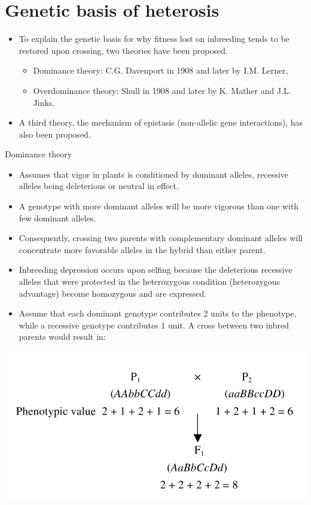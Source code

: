 \documentclass[11pt,ignorenonframetext,aspectratio=169]{beamer}
\providecommand{\tightlist}{%
  \setlength{\itemsep}{0pt}\setlength{\parskip}{0pt}}
\begin{document}
\hypertarget{genetic-basis-of-heterosis}{%
\section{Genetic basis of heterosis}\label{genetic-basis-of-heterosis}}

\begin{frame}{}
\protect\hypertarget{section-5}{}
\begin{itemize}
\tightlist
\item
  To explain the genetic basis for why fitness lost on inbreeding tends
  to be restored upon crossing, two theories have been proposed.

  \begin{itemize}
  \tightlist
  \item
    Dominance theory: C.G. Davenport in 1908 and later by I.M. Lerner,
  \item
    Overdominance theory: Shull in 1908 and later by K. Mather and J.L.
    Jinks.
  \end{itemize}
\item
  A third theory, the mechanism of epistasis (non-allelic gene
  interactions), has also been proposed.
\end{itemize}
\end{frame}

\begin{frame}{Dominance theory}
\protect\hypertarget{dominance-theory}{}
\small

\begin{itemize}
\tightlist
\item
  Assumes that vigor in plants is conditioned by dominant alleles,
  recessive alleles being deleterious or neutral in effect.
\item
  \alert{A genotype with more dominant alleles will be more vigorous than one with few dominant alleles.}
\item
  Consequently, crossing two parents with complementary dominant alleles
  will concentrate more favorable alleles in the hybrid than either
  parent.
\item
  Inbreeding depression occurs upon selfing because the deleterious
  recessive alleles that were protected in the heterozygous condition
  (\alert{heterozygous advantage}) become homozygous and are expressed.
\item
  Assume that each dominant genotype contributes 2 units to the
  phenotype, while a recessive genotype contributes 1 unit. A cross
  between two inbred parents would result in:
\end{itemize}

\begin{center}\includegraphics[width=0.4\linewidth]{./images/dominance_theory} \end{center}
\end{frame}
\end{document}
